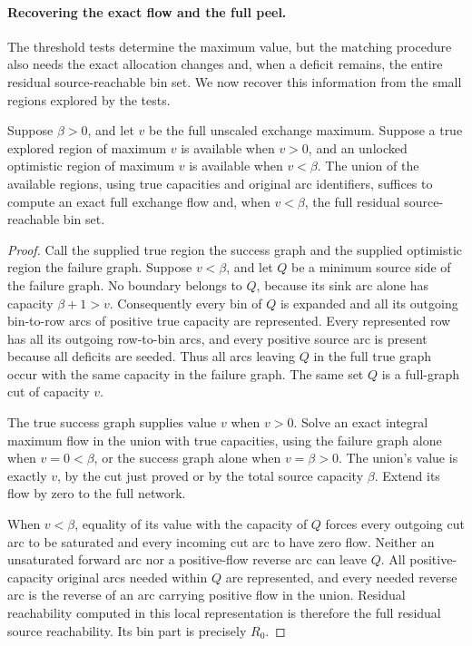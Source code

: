 \paragraph{Recovering the exact flow and the full peel.}
The threshold tests determine the maximum value, but the matching
procedure also needs the exact allocation changes and, when a deficit
remains, the entire residual source-reachable bin set.  We now recover
this information from the small regions explored by the tests.

\begin{lemma}
\label{proj:local-cut}
Suppose \(\beta>0\), and let \(v\) be the full unscaled exchange maximum.
Suppose a true
explored region of maximum \(v\) is available when \(v>0\), and
an unlocked optimistic region of maximum \(v\) is available when
\(v<\beta\).  The union of the available regions, using true
capacities and original arc identifiers, suffices to compute an
exact full exchange flow and, when \(v<\beta\), the full residual
source-reachable bin set.
\end{lemma}

\begin{proof}
Call the supplied true region the success graph and the supplied
optimistic region the failure graph.  Suppose \(v<\beta\), and
let \(Q\) be a minimum source side of the failure graph.
No boundary belongs to \(Q\), because its
sink arc alone has capacity \(\beta+1>v\).  Consequently every
bin of \(Q\) is expanded and all its outgoing bin-to-row arcs of
positive true capacity are represented.  Every represented row
has all its outgoing row-to-bin arcs, and every positive source
arc is present because all deficits are seeded.  Thus all arcs
leaving \(Q\) in the full true graph occur with the same capacity
in the failure graph.  The same set \(Q\) is a full-graph cut
of capacity \(v\).

The true success graph supplies value \(v\) when \(v>0\).
Solve an exact integral maximum flow in the union with true
capacities, using the failure graph alone when \(v=0<\beta\),
or the success graph alone when \(v=\beta>0\).
The union's value is exactly \(v\), by the cut just proved or by
the total source capacity \(\beta\).
Extend its flow by zero to the full network.

When \(v<\beta\), equality of its value with the capacity of
\(Q\) forces every outgoing cut arc to be saturated and every
incoming cut arc to have zero flow.  Neither an unsaturated
forward arc nor a positive-flow reverse arc can leave \(Q\).
All positive-capacity original arcs needed within \(Q\) are
represented, and every needed reverse arc is the reverse of
an arc carrying positive flow in the union.
Residual reachability computed in this local representation is
therefore the full residual source reachability.  Its bin part
is precisely \(R_0\).
\end{proof}

